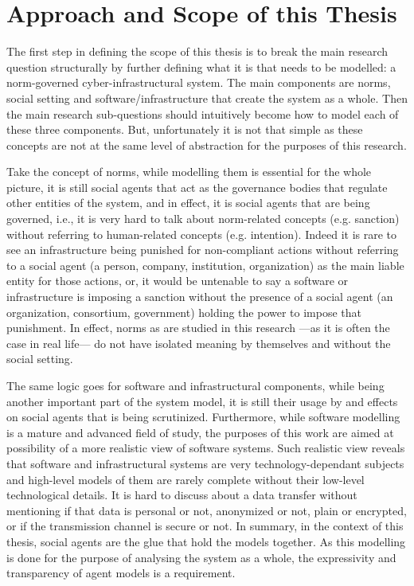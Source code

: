 \section{Approach and Scope of this Thesis}
The first step in defining the scope of this thesis is to break the main research question structurally by further defining what it is that needs to be modelled: a norm-governed cyber-infrastructural system. The main components are norms, social setting and software/infrastructure that create the system as a whole. 
Then the main research sub-questions should intuitively become how to model each of these three components. But, unfortunately it is not that simple as these concepts are not at the same level of abstraction for the purposes of this research. 

Take the concept of norms, while modelling them is essential for the whole picture, it is still social agents that act as the governance bodies that regulate other entities of the system, and in effect, it is social agents that are being governed, i.e., it is very hard to talk about norm-related concepts (e.g. sanction) without referring to human-related concepts (e.g. intention).
Indeed it is rare to see an infrastructure being punished for non-compliant actions without referring to a social agent (a person, company, institution, organization) as the main liable entity for those actions, or, it would be untenable to say a software or infrastructure is imposing a sanction without the presence of a social agent (an organization, consortium, government)  holding the power to impose that punishment. In effect, norms as are studied in this research ---as it is often the case in real life--- do not have isolated meaning by themselves and without the social setting. 

The same logic goes for software and infrastructural components, while being another important part of the system model, it is still their usage by and effects on social agents that is being scrutinized. Furthermore, while software modelling is a mature and advanced field of study, the purposes of this work are aimed at possibility of a more realistic view of software systems. Such realistic view reveals that software and infrastructural systems are very technology-dependant subjects and high-level models of them are rarely complete without their low-level technological details. It is hard to discuss about a data transfer without mentioning if that data is personal or not, anonymized or not, plain or encrypted, or if the transmission channel is secure or not. In summary, in the context of this thesis, social agents are the glue that hold the models together. As this modelling is done for the purpose of analysing the system as a whole, the expressivity and transparency of agent models is a requirement.


